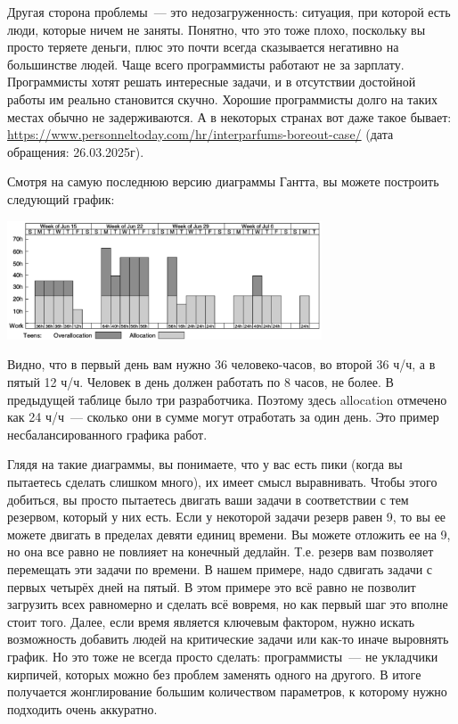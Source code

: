 \documentclass{../../text-style}
\begin{document}
Другая сторона проблемы~--- это недозагруженность: ситуация, при которой есть люди, которые ничем не заняты. Понятно, что это тоже плохо, поскольку вы просто теряете деньги, плюс это почти всегда сказывается негативно на большинстве людей. Чаще всего программисты работают не за зарплату. Программисты хотят решать интересные задачи, и в отсутствии достойной работы им реально становится скучно. Хорошие программисты долго на таких местах обычно не задерживаются. А в некоторых странах вот даже такое бывает: \url{https://www.personneltoday.com/hr/interparfums-boreout-case/} (дата обращения: 26.03.2025г).

Смотря на самую последнюю версию диаграммы Гантта, вы можете построить следующий график:

\begin{center}
    \includegraphics[width=0.7\textwidth]{resourceAllocation.png}
\end{center}

Видно, что в первый день вам нужно 36 человеко-часов, во второй 36 ч/ч, а в пятый 12 ч/ч. Человек в день должен работать по 8 часов, не более. В предыдущей таблице было три разработчика. Поэтому здесь allocation отмечено как 24 ч/ч~--- сколько они в сумме могут отработать за один день. Это пример несбалансированного графика работ.

Глядя на такие диаграммы, вы понимаете, что у вас есть пики (когда вы пытаетесь сделать слишком много), их имеет смысл выравнивать. Чтобы этого добиться, вы просто пытаетесь двигать ваши задачи в соответствии с тем резервом, который у них есть. Если у некоторой задачи резерв равен 9, то вы ее можете двигать в пределах девяти единиц времени. Вы можете отложить ее на 9, но она все равно не повлияет на конечный дедлайн. Т.е. резерв вам позволяет перемещать эти задачи по времени. В нашем примере, надо сдвигать задачи с первых четырёх дней на пятый. В этом примере это всё равно не позволит загрузить всех равномерно и сделать всё вовремя, но как первый шаг это вполне стоит того. Далее, если время является ключевым фактором, нужно искать возможность добавить людей на критические задачи или как-то иначе выровнять график. Но это тоже не всегда просто сделать: программисты~--- не укладчики кирпичей, которых можно без проблем заменять одного на другого. В итоге получается жонглирование большим количеством параметров, к которому нужно подходить очень аккуратно.
\end{document}

